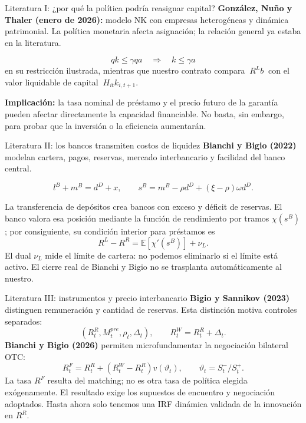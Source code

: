 \documentclass[aspectratio=169,11pt]{beamer}
\begin{document}
\begin{frame}{Literatura I: ¿por qué la política podría reasignar capital?}
\small
\textbf{González, Nuño y Thaler (enero de 2026):}
modelo NK con empresas heterogéneas y dinámica patrimonial.
La política monetaria afecta asignación; la relación general
ya estaba en la literatura.
\medskip

\[
qk\leq\gamma qa
\quad\Longrightarrow\quad k\leq\gamma a
\]
en su restricción ilustrada, mientras que nuestro contrato compara
$\ R^L b\ $ con el valor liquidable de capital
$\ H_{it} k_{i,t+1}$.

\medskip
\textbf{Implicación:} la tasa nominal de préstamo y el precio
futuro de la garantía pueden afectar directamente la
capacidad financiable. No basta, sin embargo, para probar
que la inversión o la eficiencia aumentarán.
\end{frame}

\begin{frame}{Literatura II: los bancos transmiten costos de liquidez}
\small
\textbf{Bianchi y Bigio (2022)} modelan cartera, pagos, reservas,
mercado interbancario y facilidad del banco central.
\medskip

\[
l^B+m^B=d^D+x,\qquad
s^B=m^B-\rho d^D+(\xi-\rho)\omega d^D.
\]

La transferencia de depósitos crea bancos con exceso y déficit
de reservas. El banco valora esa posición mediante la función
de rendimiento por tramos $\chi(s^B)$; por consiguiente,
su condición interior para préstamos es
\[
\boxed{R^L-R^R=\mathbb E[\chi'(s^B)]+\nu_L}.
\]
\footnotesize
El dual $\nu_L$ mide el límite de cartera: no podemos eliminarlo
si el límite está activo. El cierre real de Bianchi y Bigio
no se trasplanta automáticamente al nuestro.
\end{frame}

\begin{frame}{Literatura III: instrumentos y precio interbancario}
\small
\textbf{Bigio y Sannikov (2023)} distinguen remuneración
y cantidad de reservas. Esta distinción motiva controles separados:
\[
\left(R^R_t,M_t^{pre},\rho_t,\Delta_t\right),\qquad
R^W_t=R^R_t+\Delta_t.
\]
\textbf{Bianchi y Bigio (2026)} permiten microfundamentar
la negociación bilateral OTC:
\[
\boxed{R^F_t=R^R_t+\left(R^W_t-R^R_t\right)v(\vartheta_t)},
\qquad \vartheta_t=S^-_t/S^+_t.
\]
\footnotesize
La tasa $R^F$ resulta del matching; no es otra tasa de
política elegida exógenamente. El resultado exige los supuestos
de encuentro y negociación adoptados. Hasta ahora solo
tenemos una IRF dinámica validada de la innovación en $R^R$.
\end{frame}
\end{document}
